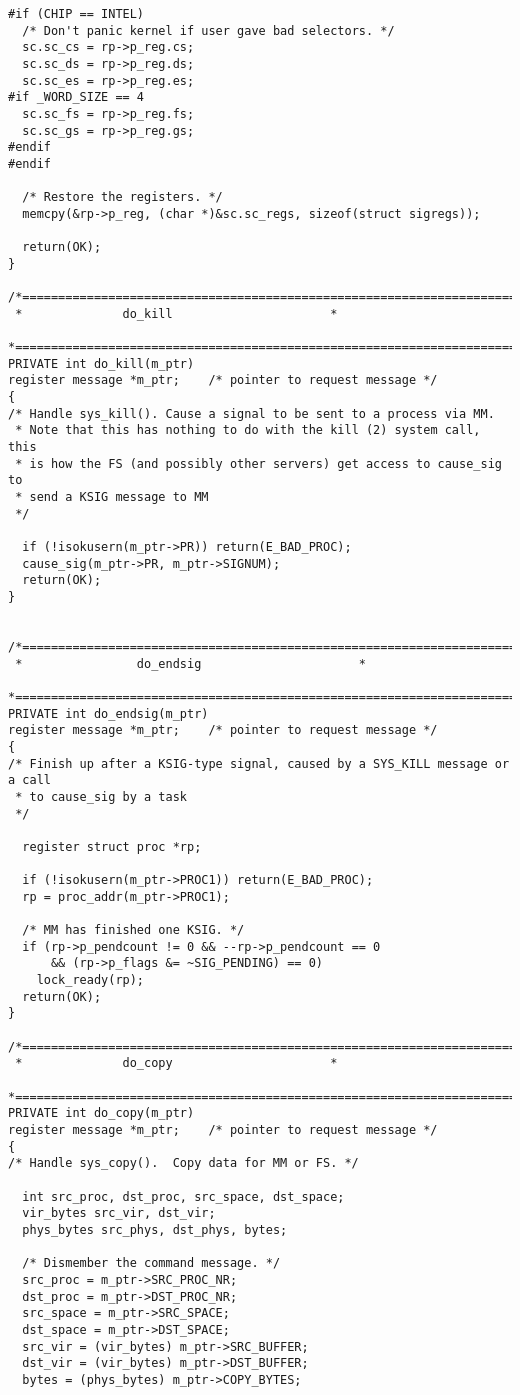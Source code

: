 \begin{verbatim}
#if (CHIP == INTEL)
  /* Don't panic kernel if user gave bad selectors. */
  sc.sc_cs = rp->p_reg.cs;
  sc.sc_ds = rp->p_reg.ds;
  sc.sc_es = rp->p_reg.es;
#if _WORD_SIZE == 4
  sc.sc_fs = rp->p_reg.fs;
  sc.sc_gs = rp->p_reg.gs;
#endif
#endif

  /* Restore the registers. */
  memcpy(&rp->p_reg, (char *)&sc.sc_regs, sizeof(struct sigregs));

  return(OK);
}

/*===========================================================================*
 *				do_kill					     *
 *===========================================================================*/
PRIVATE int do_kill(m_ptr)
register message *m_ptr;	/* pointer to request message */
{
/* Handle sys_kill(). Cause a signal to be sent to a process via MM.
 * Note that this has nothing to do with the kill (2) system call, this
 * is how the FS (and possibly other servers) get access to cause_sig to
 * send a KSIG message to MM
 */

  if (!isokusern(m_ptr->PR)) return(E_BAD_PROC);
  cause_sig(m_ptr->PR, m_ptr->SIGNUM);
  return(OK);
}


/*===========================================================================*
 *			      do_endsig					     *
 *===========================================================================*/
PRIVATE int do_endsig(m_ptr)
register message *m_ptr;	/* pointer to request message */
{
/* Finish up after a KSIG-type signal, caused by a SYS_KILL message or a call
 * to cause_sig by a task
 */

  register struct proc *rp;

  if (!isokusern(m_ptr->PROC1)) return(E_BAD_PROC);
  rp = proc_addr(m_ptr->PROC1);

  /* MM has finished one KSIG. */
  if (rp->p_pendcount != 0 && --rp->p_pendcount == 0
      && (rp->p_flags &= ~SIG_PENDING) == 0)
	lock_ready(rp);
  return(OK);
}

/*===========================================================================*
 *				do_copy					     *
 *===========================================================================*/
PRIVATE int do_copy(m_ptr)
register message *m_ptr;	/* pointer to request message */
{
/* Handle sys_copy().  Copy data for MM or FS. */

  int src_proc, dst_proc, src_space, dst_space;
  vir_bytes src_vir, dst_vir;
  phys_bytes src_phys, dst_phys, bytes;

  /* Dismember the command message. */
  src_proc = m_ptr->SRC_PROC_NR;
  dst_proc = m_ptr->DST_PROC_NR;
  src_space = m_ptr->SRC_SPACE;
  dst_space = m_ptr->DST_SPACE;
  src_vir = (vir_bytes) m_ptr->SRC_BUFFER;
  dst_vir = (vir_bytes) m_ptr->DST_BUFFER;
  bytes = (phys_bytes) m_ptr->COPY_BYTES;


\end{verbatim}
